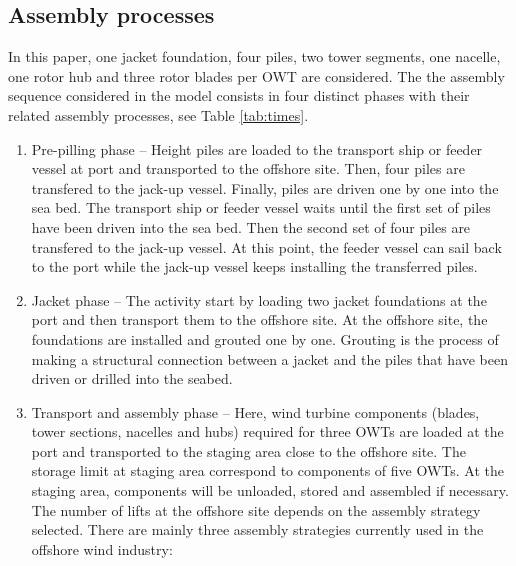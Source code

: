 \subsection{Assembly processes}
In this paper, one jacket foundation, four piles, two tower segments, one nacelle, one rotor hub and three rotor blades per OWT are considered. The the assembly sequence considered in the model consists in four distinct phases with their related assembly processes, see Table \ref{tab:times}.
\begin{enumerate}
\item Pre-pilling phase -- Height piles are loaded to the transport ship or feeder vessel at port and transported to the offshore site. Then, four piles are transfered to the jack-up vessel. Finally, piles are driven one by one into the sea bed. The transport ship or feeder vessel waits until the first set of piles have been driven into the sea bed. Then the second set of four piles are transfered to the jack-up vessel. At this point, the feeder vessel can sail back to the port while the jack-up vessel keeps installing the transferred piles. %

\item Jacket phase -- The activity start by loading two jacket foundations at the port and then transport them to the offshore site. At the offshore site, the foundations are installed and grouted one by one. Grouting is the process of making a structural connection between a jacket and the piles that have been driven or drilled into the seabed. %

\item Transport and assembly phase -- Here, wind turbine components (blades, tower sections, nacelles and hubs) required for three OWTs are loaded at the port and transported to the staging area close to the offshore site. The storage limit at staging area correspond to components of five OWTs. At the staging area, components will be unloaded, stored and assembled if necessary. The number of lifts at the offshore site depends on the assembly strategy selected. There are mainly three assembly strategies currently used in the offshore wind industry:


\end{enumerate}
